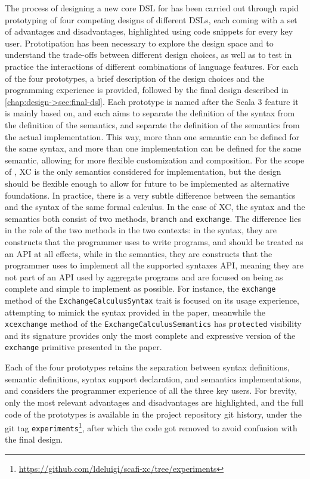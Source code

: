 The process of designing a new core \ac{DSL} for \this has been carried out through rapid prototyping of four competing designs of different \acp{DSL}, each coming with a set of advantages and disadvantages, highlighted using code snippets for every key user.
%
Prototipation has been necessary to explore the design space and to understand the trade-offs between different design choices, as well as to test in practice the interactions of different combinations of language features.
%
For each of the four prototypes, a brief description of the design choices and the programming experience is provided, followed by the final design described in \cref{chap:design->sec:final-dsl}.
%
Each prototype is named after the Scala 3 feature it is mainly based on, and each aims to separate the definition of the syntax from the definition of the semantics, and separate the definition of the semantics from the actual implementation.
%
This way, more than one semantic can be defined for the same syntax, and more than one implementation can be defined for the same semantic, allowing for more flexible customization and composition.
%
For the scope of \this, \ac{XC}\cite{xc} is the only semantics considered for implementation, but the design should be flexible enough to allow for future  to be implemented as alternative foundations.
%
In practice, there is a very subtle difference between the semantics and the syntax of the same formal calculus.
%
In the case of \ac{XC}, the syntax and the semantics both consist of two methods, \texttt{branch} and \texttt{exchange}.
%
The difference lies in the role of the two methods in the two contexts: in the syntax, they are constructs that the programmer uses to write programs, and should be treated as an \ac{API} at all effects, while in the semantics, they are constructs that the programmer uses to implement all the supported syntaxes \ac{API}, meaning they are not part of an \ac{API} used by aggregate programs and are focused on being as complete and simple to implement as possible.
%
For instance, the \texttt{exchange} method of the \texttt{ExchangeCalculusSyntax} trait is focused on its usage experience, attempting to mimick the syntax provided in the paper, meanwhile the \texttt{xcexchange} method of the \texttt{ExchangeCalculusSemantics} has \texttt{protected} visibility and its signature provides only the most complete and expressive version of the \texttt{exchange} primitive presented in the paper\cite{xc}.

Each of the four prototypes retains the separation between syntax definitions, semantic definitions, syntax support declaration, and semantics implementations, and considers the programmer experience of all the three key users.
%
For brevity, only the most relevant advantages and disadvantages are highlighted, and the full code of the prototypes is available in the project repository git history, under the git tag \texttt{experiments}\footnote{\url{https://github.com/ldeluigi/scafi-xc/tree/experiments}}, after which the code got removed to avoid confusion with the final design.


